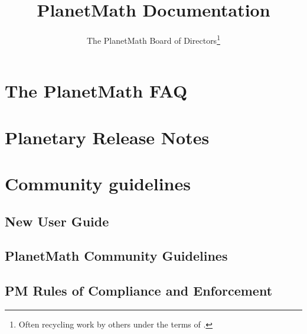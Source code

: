 \documentclass[12pt,report]{memoir}
\begin{document}
\renewcommand{\abstract}[1]{\begin{center}\begin{quote}
\emph{#1}
\end{quote}\end{center}}

\title{PlanetMath Documentation}
\author{The PlanetMath Board of Directors\thanks{Often recycling work by others under the terms of \ccbysa.}}

\begin{titlingpage}
\maketitle
\end{titlingpage}

\frontmatter

\renewcommand{\cftchapterfont}{\scshape}
\renewcommand{\cftchapterpagefont}{\scshape}

\tableofcontents*
\cleardoublepage

\mainmatter

\chapter{The PlanetMath FAQ}


\chapter{Planetary Release Notes}


\chapter{Community guidelines}

\section{New User Guide}


\section{PlanetMath Community Guidelines}


\section{PM Rules of Compliance and Enforcement}

\end{document}
